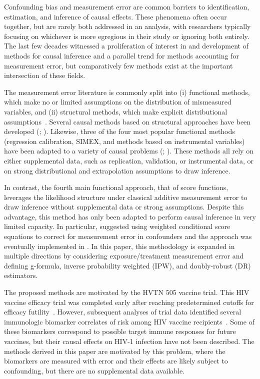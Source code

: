 \documentclass[useAMS,usenatbib,referee]{biom}
\begin{document}
Confounding bias and measurement error are common barriers to identification, estimation, and inference of causal effects. These phenomena often occur together, but are rarely both addressed in an analysis, with researchers typically focusing on whichever is more egregious in their study or ignoring both entirely. The last few decades witnessed a proliferation of interest in and development of methods for causal inference and a parallel trend for methods accounting for measurement error, but comparatively few methods exist at the important intersection of these fields.

The measurement error literature is commonly split into (i) functional methods, which make no or limited assumptions on the distribution of mismeasured variables, and (ii) structural methods, which make explicit distributional assumptions~\citep{carroll2006}. Several causal methods based on structural approaches have been developed (\citealp{kuroki2014,edwards2015multiple,braun2017}; \citealp*{hong2017}). Likewise, three of the four most popular functional methods (regression calibration, SIMEX, and methods based on instrumental variables) have been adapted to a variety of causal problems (\citealp*{vansteelandt2009}; \citealp{cole2010,kendall2015,lockwood2015,kyle2016,wu2019}). These methods all rely on either supplemental data, such as replication, validation, or instrumental data, or on strong distributional and extrapolation assumptions to draw inference.

In contrast, the fourth main functional approach, that of score functions, leverages the likelihood structure under classical additive measurement error to draw inference without supplemental data or strong assumptions. Despite this advantage, this method has only been adapted to perform causal inference in very limited capacity. In particular, \citet*{mccaffrey2013} suggested using weighted conditional score equations to correct for measurement error in confounders and the approach was eventually implemented in \citet{shu2019}. In this paper, this methodology is expanded in multiple directions by considering exposure/treatment measurement error and defining g-formula, inverse probability weighted (IPW), and doubly-robust (DR) estimators.

The proposed methods are motivated by the HVTN 505 vaccine trial. This HIV vaccine efficacy trial was completed early after reaching predetermined cutoffs for efficacy futility~\citep{hammer2013}. However, subsequent analyses of trial data identified several immunologic biomarker correlates of risk among HIV vaccine recipients~\citep{janes2017,fong2018,neidich2019}. Some of these biomarkers correspond to possible target immune responses for future vaccines, but their causal effects on HIV-1 infection have not been described. The methods derived in this paper are motivated by this problem, where the biomarkers are measured with error and their effects are likely subject to confounding, but there are no supplemental data available.
\end{document}
